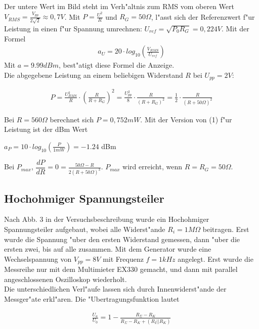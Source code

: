 \documentclass[10pt]{article}
\begin{document}
Der untere Wert im Bild steht im Verh"altnis zum RMS vom oberen Wert $V_{RMS}=\frac{V_{pp}}{2 \sqrt{2}} \approx 0,7V$. Mit $P=\frac{U^2}{R}$ und $R_G=50 \Omega$, l"asst sich der Referenzwert f"ur Leistung in einen f"ur Spannung umrechnen: $U_{ref}=\sqrt{P_0 R_G}=0,224 V$. Mit der Formel
\begin{eqnarray}
 a_U = 20 \cdot log_{10}(\frac{V_{RMS}}{U_{ref}})
\end{eqnarray}
Mit $a=9.99 dBm$, best"atigt diese Formel die Anzeige.\\

Die abgegebene Leistung an einem beliebigen Widerstand $R$ bei $U_{pp}=2V$:

\begin{eqnarray}
 P = \frac{U_{RMS}^2}{R} \cdot (\frac{R}{R+R_G})^2 = \frac{U_{pp}^2}{8} \cdot \frac{R}{(R+R_G)^2} = \frac{1}{2} \cdot \frac{R}{(R+50\Omega)^2}
\end{eqnarray}

Bei $R=560 \Omega$ berechnet sich $P=0,752mW$. Mit der Version von (1) f"ur Leistung ist der dBm Wert 
\begin{center}
$a_P = 10 \cdot log_{10}(\frac{P}{1mW})=-1.24$ dBm
\end{center}

Bei $P_{max}$, $\dfrac{dP}{dR}=0=\frac{50 \Omega - R}{2(R+50 \Omega)^3}$. $P_{max}$ wird erreicht, wenn $R=R_G=50 \Omega$.


\subsection{Hochohmiger Spannungsteiler}

Nach Abb. 3 in der Versuchsbeschreibung wurde ein Hochohmiger Spannungsteiler aufgebaut, wobei alle Widerst"ande $R_i=1M\Omega$ beitragen. Erst wurde die Spannung "uber den ersten Widerstand gemessen, dann "uber die ersten zwei, bis auf alle zusammen. Mit dem Generator wurde eine Wechselspannung von $V_{pp}=8V$ mit Frequenz $f=1kHz$ angelegt. Erst wurde die Messreihe nur mit dem Multimieter EX330 gemacht, und dann mit parallel angeschlossenen Oszilloskop wiederholt.\\


Die unterschiedlichen Verl"aufe lassen sich durch Innenwiderst"ande der Messger"ate erkl"aren. Die "Ubertragungsfunktion lautet

\begin{eqnarray}
 \frac{U_a}{U_0} = 1-\frac{R_{\Sigma}-R_K}{R_{\Sigma}-R_K+(R_I \vert \vert R_K)}
\end{eqnarray}
\end{document}
